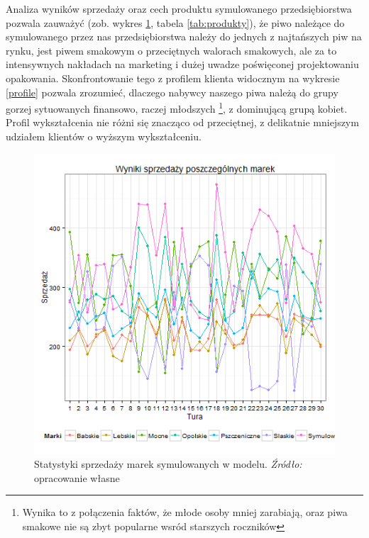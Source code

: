 \documentclass[polish, twoside, 12pt, a4paper]{article}
\theoremstyle{definition}
\theoremstyle{plain}
\theoremstyle{remark}
\begin{document}
Analiza wyników sprzedaży oraz cech produktu symulowanego przedsiębiorstwa pozwala zauważyć (zob. wykres \ref{fig:sprzedaz_marek}, tabela \ref{tab:produkty}), że piwo należące do symulowanego przez nas przedsiębiorstwa należy do jednych z najtańszych piw na rynku, jest piwem smakowym o przeciętnych walorach smakowych, ale za to intensywnych nakładach na marketing i dużej uwadze poświęconej projektowaniu opakowania. Skonfrontowanie tego z profilem klienta widocznym na wykresie \ref{profile} pozwala zrozumieć, dlaczego nabywcy naszego piwa należą do grupy gorzej sytuowanych finansowo, raczej młodszych \footnote{Wynika to z połączenia faktów, że młode osoby mniej zarabiają, oraz piwa smakowe nie są zbyt popularne wsród starszych roczników}, z dominującą grupą kobiet. Profil wykształcenia nie różni się znacząco od przeciętnej, z delikatnie mniejszym udziałem klientów o wyższym wykształceniu.

\begin{figure}[hbt]
  \centering
    \includegraphics[width=\textwidth]{pictures/sprzedaz_marek.png}
  \captionsetup{margin=10pt,font=small,labelfont=bf,width=.8\textwidth}
  \caption[Statystyki sprzedaży marek symulowanych w modelu]{Statystyki sprzedaży marek symulowanych w modelu. \textit{Źródło:} opracowanie własne}\label{fig:sprzedaz_marek}
\end{figure}
\end{document}
